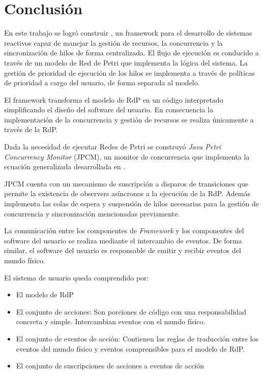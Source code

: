 \section{Conclusión}

En este trabajo se logró construir \textit{\nombreFramework}, un framework para
el desarrollo de sistemas reactivos capaz de manejar la gestión de recursos, la
concurrencia y la sincronización de hilos de forma centralizada. El flujo de
ejecución es conducido a través de un modelo de Red de Petri que implementa la
lógica del sistema.
La gestión de prioridad de ejecución de los hilos se implementa a través de
políticas de prioridad a cargo del usuario, de forma separada al modelo.

El framework transforma el modelo de RdP en un código interpretado simplificando
el diseño del software del usuario. En consecuencia la implementación de la
concurrencia y gestión de recursos se realiza únicamente a través de la RdP.

Dada la necesidad de ejecutar Redes de Petri se construyó \textit{Java Petri
Concurrency Monitor} (JPCM), un monitor de concurrencia que implementa la
ecuación generalizada desarrollada en \cite{Ecuacion_generalizada_LAC}.

JPCM cuenta con un mecanismo de suscripción a disparos de transiciones que
permite la existencia de observers asíncronos a la ejecución de la RdP.
Además implementa las colas de espera y suspensión de hilos necesarias para 
la gestión de concurrencia y sincronización mencionadas previamente.

La comunicación entre los componentes de \textit{\nombreFramework Framework} y
los componentes del software del usuario se realiza mediante el intercambio de
eventos. De forma similar, el software del usuario es responsable de emitir y
recibir eventos del mundo físico.

El sistema de usuario queda comprendido por:
\begin{itemize}
    \item El modelo de RdP
    \item El conjunto de acciones: Son porciones de código con una
    responsabilidad concreta y simple. Intercambian eventos con el mundo físico.
    \item El conjunto de eventos de acción: Contienen las reglas de traducción
    entre los eventos del mundo físico y eventos comprensibles para el modelo de
    RdP.
    \item El conjunto de suscripciones de acciones a eventos de acción
\end{itemize}

